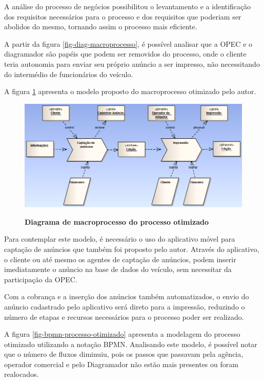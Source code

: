 \documentclass[
	12pt,				%
	openright,			%
	oneside,			%
	a4paper,			%
	chapter=TITLE,		%
	section=TITLE,		%
	english,			%
	french,				%
	spanish,			%
	brazil				%
	]{abntex2}
\begin{document}
A análise do processo de negócios possibilitou o levantamento e a identificação dos requisitos necessários para o processo e dos requisitos que poderiam ser abolidos do mesmo, tornando assim o processo mais eficiente.

A partir da figura \ref{fig-diag-macroprocesso}, é possível analisar que a OPEC e o diagramador são papéis que podem ser removidos do processo, onde o cliente teria autonomia para enviar seu próprio anúncio a ser impresso, não necessitando do intermédio de funcionários do veículo.

A figura \ref{fig-diag-macroprocesso-otimizado} apresenta o modelo proposto do macroprocesso otimizado pelo autor.
\begin{figure}[h]
	\begin{center}
		\caption{
			\textbf{Diagrama de macroprocesso do processo otimizado}
		}\label{fig-diag-macroprocesso-otimizado}
		\includegraphics [scale=0.65]{imagens/diagrama_macro_processo_otimizado.png}
		\label{fig-diag-macroprocesso-otimizado}
	\end{center}
\end{figure}

Para contemplar este modelo, é necessário o uso do aplicativo móvel para captação de anúncios que também foi proposto pelo autor. Através do aplicativo, o cliente ou até mesmo os agentes de captação de anúncios, podem inserir imediatamente o anúncio na base de dados do veículo, sem necessitar da participação da OPEC.

Com a cobrança e a inserção dos anúncios também automatizados, o envio do anúncio cadastrado pelo aplicativo será direto para a impressão, reduzindo o número de etapas e recursos necessários para o processo poder ser realizado.

A figura \ref{fig-bpmn-processo-otimizado} apresenta a modelagem do processo otimizado utilizando a notação BPMN. Analisando este modelo, é possível notar que o número de fluxos diminuiu, pois os passos que passavam pela agência, operador comercial e pelo Diagramador não estão mais presentes ou foram realocados. 
\end{document}
